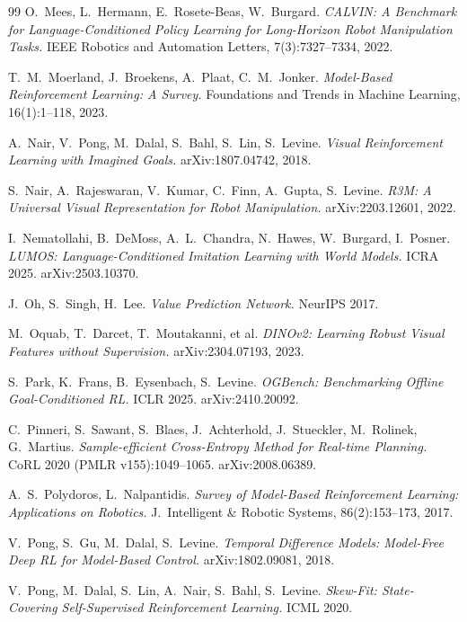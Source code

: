 \documentclass{article}
\begin{document}
\begin{thebibliography}{99}
O.~Mees, L.~Hermann, E.~Rosete-Beas, W.~Burgard.
\emph{CALVIN: A Benchmark for Language-Conditioned Policy Learning for Long-Horizon Robot Manipulation Tasks.}
IEEE Robotics and Automation Letters, 7(3):7327--7334, 2022.

T.~M.~Moerland, J.~Broekens, A.~Plaat, C.~M.~Jonker.
\emph{Model-Based Reinforcement Learning: A Survey.}
Foundations and Trends in Machine Learning, 16(1):1--118, 2023.

A.~Nair, V.~Pong, M.~Dalal, S.~Bahl, S.~Lin, S.~Levine.
\emph{Visual Reinforcement Learning with Imagined Goals.}
arXiv:1807.04742, 2018.

S.~Nair, A.~Rajeswaran, V.~Kumar, C.~Finn, A.~Gupta, S.~Levine.
\emph{R3M: A Universal Visual Representation for Robot Manipulation.}
arXiv:2203.12601, 2022.

I.~Nematollahi, B.~DeMoss, A.~L.~Chandra, N.~Hawes, W.~Burgard, I.~Posner.
\emph{LUMOS: Language-Conditioned Imitation Learning with World Models.}
ICRA 2025. arXiv:2503.10370.

J.~Oh, S.~Singh, H.~Lee.
\emph{Value Prediction Network.}
NeurIPS 2017.

M.~Oquab, T.~Darcet, T.~Moutakanni, et al.
\emph{DINOv2: Learning Robust Visual Features without Supervision.}
arXiv:2304.07193, 2023.

S.~Park, K.~Frans, B.~Eysenbach, S.~Levine.
\emph{OGBench: Benchmarking Offline Goal-Conditioned RL.}
ICLR 2025. arXiv:2410.20092.

C.~Pinneri, S.~Sawant, S.~Blaes, J.~Achterhold, J.~Stueckler, M.~Rolinek, G.~Martius.
\emph{Sample-efficient Cross-Entropy Method for Real-time Planning.}
CoRL 2020 (PMLR v155):1049--1065. arXiv:2008.06389.

A.~S.~Polydoros, L.~Nalpantidis.
\emph{Survey of Model-Based Reinforcement Learning: Applications on Robotics.}
J.~Intelligent \& Robotic Systems, 86(2):153--173, 2017.

V.~Pong, S.~Gu, M.~Dalal, S.~Levine.
\emph{Temporal Difference Models: Model-Free Deep RL for Model-Based Control.}
arXiv:1802.09081, 2018.

V.~Pong, M.~Dalal, S.~Lin, A.~Nair, S.~Bahl, S.~Levine.
\emph{Skew-Fit: State-Covering Self-Supervised Reinforcement Learning.}
ICML 2020.


\end{thebibliography}
\end{document}

